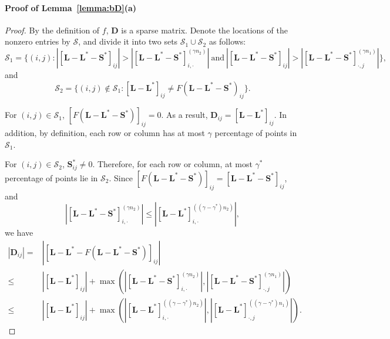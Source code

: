 \documentclass[12pt]{article}
\newcommand{\bL}{\boldsymbol{L}}
\newcommand{\bD}{\boldsymbol{D}}
\def\bS{\boldsymbol{S}}
\theoremstyle{plain}
\theoremstyle{definition}
\theoremstyle{plain}
\theoremstyle{plain}
\theoremstyle{remark}
\begin{document}
\paragraph*{Proof of Lemma~\ref{lemma:bD}(a)}
\begin{proof}
By the definition of $f$, $\bD$ is a sparse matrix. Denote the locations of the nonzero entries by $\mathcal{S}$, and divide it into two sets $\mathcal{S}_1\cup\mathcal{S}_2$ as follows:
\[
\mathcal{S}_{1}=\{(i,j):|[\bL-\bL^{*}-\bS^{*}]_{ij}|>|[\bL-\bL^{*}-\bS^{*}]_{i,\cdot}^{(\gamma n_{2})}|\ \textrm{and}\ |[\bL-\bL^{*}-\bS^{*}]_{ij}|>|[\bL-\bL^{*}-\bS^{*}]_{\cdot,j}^{(\gamma n_{1})}|\},\] 
and 
\[
\mathcal{S}_2=\{(i,j)\notin\mathcal{S}_1: [\bL-\bL^*]_{ij}\neq F(\bL-\bL^*-\bS^*)_{ij}\}.
\]

For $(i,j)\in\mathcal{S}_1$, $[F(\bL-\bL^*-\bS^*)]_{ij}=0$. As a result, $\bD_{ij}=[\bL-\bL^*]_{ij}$.%
In addition, by definition, each row or column has at most $\gamma$ percentage of points in $\mathcal{S}_1$.

For $(i,j)\in\mathcal{S}_2$, $\bS^*_{ij}\neq 0$. Therefore, for each row or column, at most $\gamma^*$ percentage of points lie in $\mathcal{S}_2$. Since $[F(\bL-\bL^*-\bS^*)]_{ij}=[\bL-\bL^*-\bS^*]_{ij}$, and 
\[
|[\bL-\bL^*-\bS^*]_{i,\cdot}^{(\gamma n_2)}|\leq |[\bL-\bL^*]_{i,\cdot}^{((\gamma-\gamma^*) n_2)}|,
\]
we have %
\begin{align*}
|\bD_{ij}| =& | [\bL-\bL^*-F(\bL-\bL^*-\bS^*)]_{ij}|\\\leq& |[\bL-\bL^*]_{ij}|+\max(|[\bL-\bL^*-\bS^*]_{i,\cdot}^{(\gamma n_2)}|, |[\bL-\bL^*-\bS^*]_{\cdot,j}^{(\gamma n_1)}|)\\
 \leq & |[\bL-\bL^*]_{ij}|+\max(|[\bL-\bL^*]_{i,\cdot}^{((\gamma-\gamma^*) n_2)}|, |[\bL-\bL^*]_{\cdot,j}^{((\gamma-\gamma^*) n_1)}|).
\end{align*}


\end{proof}
\end{document}
